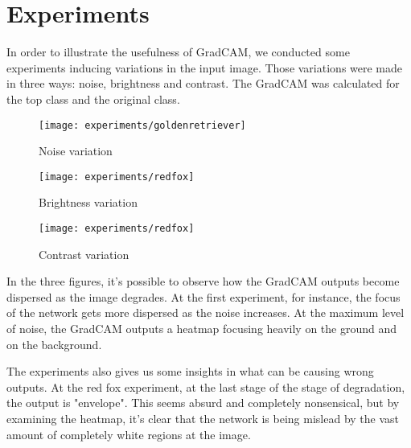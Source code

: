 \section{Experiments}

In order to illustrate the usefulness of GradCAM, we conducted some experiments inducing variations in the input image. Those variations were made in three ways: noise, brightness and contrast. The GradCAM was calculated for the top class and the original class.

\begin{figure}[H]
    \centering
    \texttt{[image: experiments/goldenretriever]}    
    \caption{Noise variation}

\end{figure}


\begin{figure}[H]
    \centering
    \texttt{[image: experiments/redfox]}    
    \caption{Brightness variation}

\end{figure}


\begin{figure}[H]
    \centering
    \texttt{[image: experiments/redfox]}    
    \caption{Contrast variation}

\end{figure}

In the three figures, it's possible to observe how the GradCAM outputs become dispersed as the image degrades. At the first experiment, for instance, the focus of the network gets more dispersed as the noise increases. At the maximum level of noise, the GradCAM outputs a heatmap focusing heavily on the ground and on the background.

The experiments also gives us some insights in what can be causing wrong outputs. At the red fox experiment, at the last stage of the stage of degradation, the output is "envelope". This seems absurd and completely nonsensical, but by examining the heatmap, it's clear that the network is being mislead by the vast amount of completely white regions at the image.